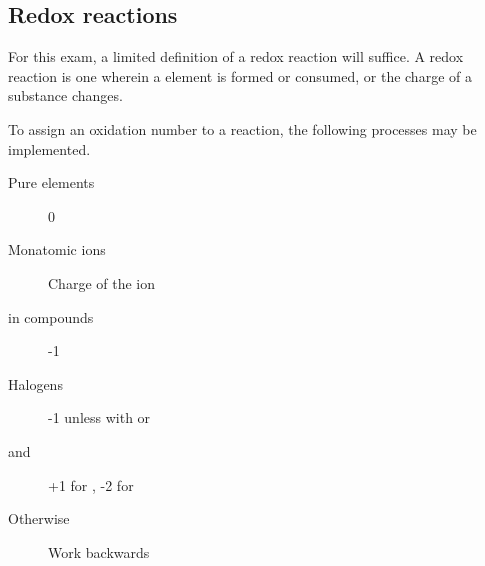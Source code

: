 \subsection{Redox reactions}
For this exam, a limited definition of a redox reaction will suffice. A redox
reaction is one wherein a element is formed or consumed, or the charge of a
substance changes.

To assign an oxidation number to a reaction, the following processes may be
implemented.

\begin{description}
  \item[Pure elements] 0
  \item[Monatomic ions] Charge of the ion
  \item[ in compounds] -1
  \item[Halogens] -1 unless with  or 
  \item[ and ] +1 for , -2 for 
  \item[Otherwise] Work backwards
\end{description}
